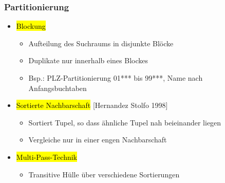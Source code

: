     
    
    \begin{frame}
    \frametitle{Partitionierung}
    
    \begin{itemize}
    \item \hl{Blockung}
    \begin{itemize}
    \item Aufteilung des Suchraums in disjunkte Blöcke
    \item Duplikate nur innerhalb eines Blockes 
    \item Bsp.: PLZ-Partitionierung 01*** bis 99***, Name nach Anfangsbuchtaben
    \end{itemize}
    \item \hl{Sortierte Nachbarschaft} [Hernandez Stolfo 1998]
    \begin{itemize}
    \item Sortiert Tupel, so dass ähnliche Tupel nah beieinander liegen
    \item Vergleiche nur in einer engen Nachbarschaft
    \end{itemize}
    \item \hl{Multi-Pass-Technik}
    \begin{itemize}
    \item Transitive Hülle über verschiedene Sortierungen
    \end{itemize}
    \end{itemize}
    
    \end{frame}
    
    
